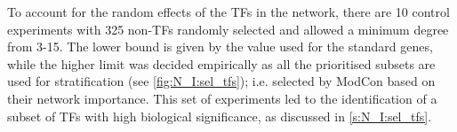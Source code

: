 To account for the random effects of the TFs in the network, there are 10 control experiments with 325 non-TFs randomly selected and allowed a minimum degree from 3-15. The lower bound is given by the value used for the standard genes, while the higher limit was decided empirically as all the prioritised subsets are used for stratification (see \cref{fig:N_I:sel_tfs}); i.e. selected by ModCon based on their network importance. This set of experiments led to the identification of a subset of TFs with high biological significance, as discussed in \cref{s:N_I:sel_tfs}.


